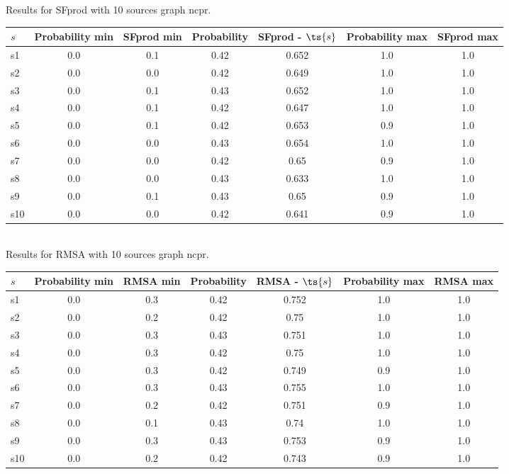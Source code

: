\documentclass{article}
\begin{document}
\noindent Results for SFprod with 10 sources graph ncpr.

\noindent\begin{tabular}{|l|c|c|c|c|c|c|}
\hline
$s$& Probability min & SFprod min & Probability & SFprod - $\ts{s}$ & Probability max & SFprod max\\
\hline
s1 &0.0 & 0.1 & 0.42 & 0.652 & 1.0 & 1.0\\
\hline
s2 &0.0 & 0.0 & 0.42 & 0.649 & 1.0 & 1.0\\
\hline
s3 &0.0 & 0.1 & 0.43 & 0.652 & 1.0 & 1.0\\
\hline
s4 &0.0 & 0.1 & 0.42 & 0.647 & 1.0 & 1.0\\
\hline
s5 &0.0 & 0.1 & 0.42 & 0.653 & 0.9 & 1.0\\
\hline
s6 &0.0 & 0.0 & 0.43 & 0.654 & 1.0 & 1.0\\
\hline
s7 &0.0 & 0.0 & 0.42 & 0.65 & 0.9 & 1.0\\
\hline
s8 &0.0 & 0.0 & 0.43 & 0.633 & 1.0 & 1.0\\
\hline
s9 &0.0 & 0.1 & 0.43 & 0.65 & 0.9 & 1.0\\
\hline
s10 &0.0 & 0.0 & 0.42 & 0.641 & 0.9 & 1.0\\
\hline
\end{tabular}\\

\noindent Results for RMSA with 10 sources graph ncpr.

\noindent\begin{tabular}{|l|c|c|c|c|c|c|}
\hline
$s$& Probability min & RMSA min & Probability & RMSA - $\ts{s}$ & Probability max & RMSA max\\
\hline
s1 &0.0 & 0.3 & 0.42 & 0.752 & 1.0 & 1.0\\
\hline
s2 &0.0 & 0.2 & 0.42 & 0.75 & 1.0 & 1.0\\
\hline
s3 &0.0 & 0.3 & 0.43 & 0.751 & 1.0 & 1.0\\
\hline
s4 &0.0 & 0.3 & 0.42 & 0.75 & 1.0 & 1.0\\
\hline
s5 &0.0 & 0.3 & 0.42 & 0.749 & 0.9 & 1.0\\
\hline
s6 &0.0 & 0.3 & 0.43 & 0.755 & 1.0 & 1.0\\
\hline
s7 &0.0 & 0.2 & 0.42 & 0.751 & 0.9 & 1.0\\
\hline
s8 &0.0 & 0.1 & 0.43 & 0.74 & 1.0 & 1.0\\
\hline
s9 &0.0 & 0.3 & 0.43 & 0.753 & 0.9 & 1.0\\
\hline
s10 &0.0 & 0.2 & 0.42 & 0.743 & 0.9 & 1.0\\
\hline
\end{tabular}\\
\end{document}
